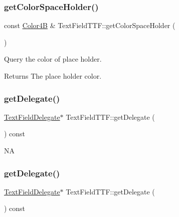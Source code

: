 \subsubsection{\texorpdfstring{get\+Color\+Space\+Holder()}{getColorSpaceHolder()}\hspace{0.1cm}{\footnotesize\ttfamily [2/2]}}
{\footnotesize\ttfamily const \hyperlink{structColor4B}{Color4B} \& Text\+Field\+T\+T\+F\+::get\+Color\+Space\+Holder (\begin{DoxyParamCaption}{ }\end{DoxyParamCaption})\hspace{0.3cm}{\ttfamily [virtual]}}

Query the color of place holder. \begin{DoxyReturn}{Returns}
The place holder color. 
\end{DoxyReturn}
\mbox{\label{classTextFieldTTF_a9e70cd73fc3190132028b659f40701d1}} 
\subsubsection{\texorpdfstring{get\+Delegate()}{getDelegate()}\hspace{0.1cm}{\footnotesize\ttfamily [1/2]}}
{\footnotesize\ttfamily \hyperlink{classTextFieldDelegate}{Text\+Field\+Delegate}$\ast$ Text\+Field\+T\+T\+F\+::get\+Delegate (\begin{DoxyParamCaption}{ }\end{DoxyParamCaption}) const\hspace{0.3cm}{\ttfamily [inline]}}

NA \mbox{\label{classTextFieldTTF_a9e70cd73fc3190132028b659f40701d1}} 
\subsubsection{\texorpdfstring{get\+Delegate()}{getDelegate()}\hspace{0.1cm}{\footnotesize\ttfamily [2/2]}}
{\footnotesize\ttfamily \hyperlink{classTextFieldDelegate}{Text\+Field\+Delegate}$\ast$ Text\+Field\+T\+T\+F\+::get\+Delegate (\begin{DoxyParamCaption}{ }\end{DoxyParamCaption}) const\hspace{0.3cm}{\ttfamily [inline]}}

